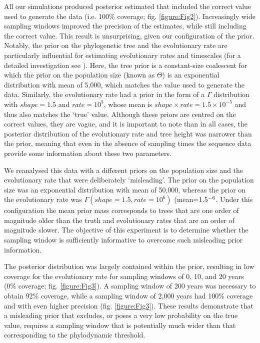 \documentclass[11pt]{article}
\begin{document}
All our simulations produced posterior estimated that included the correct value used to generate the data (i.e. 100\% coverage; fig. \ref{figure:Fig2}). Increasingly wide sampling windows improved the precision of the estimates, while still including the correct value. This result is unsurprising, given our configuration of the prior. Notably, the prior on the phylogenetic tree and the evolutionary rate are particularly influential for estimating evolutionary rates and timescales (for a detailed investigation see \cite{tay2024assessing}). Here, the tree prior is a constant-size coalescent for which the prior on the population size (known as $\Theta$) is an exponential distribution with mean of 5,000, which matches the value used to generate the data. Similarly, the evolutionary rate had a prior in the form of a $\Gamma$ distribution with $shape=1.5$ and $rate=10^{5}$, whose mean is $shape\times rate=1.5\times10^{-5}$ and thus also matches the `true' value. Although these priors are centred on the correct values, they are vague, and it is important to note than in all cases, the posterior distribution of the evolutionary rate and tree height was narrower than the prior, meaning that even in the absence of sampling times the sequence data provide some information about these two parameters.

We reanalysed this data with a different priors on the population size and the evolutionary rate that were deliberately `misleading'. The prior on the population size was an exponential distribution with mean of 50,000, whereas the prior on the evolutionary rate was $\Gamma(shape=1.5, rate=10^{6})$ (mean=$1.5\time10^{-6}$. Under this configuration the mean prior mass corresponds to trees that are one order of magnitude older than the truth and evolutionary rates that are an order of magnitude slower. The objective of this experiment is to determine whether the sampling window is sufficiently informative to overcome such misleading prior information.

The posterior distribution was largely contained within the prior, resulting in low coverage for the evolutionary rate for sampling windows of 0, 10, and 20 years (0\% coverage; fig. \ref{figure:Fig3}). A sampling window of 200 years was necessary to obtain 92\% coverage, while a sampling window of 2,000 years had 100\% coverage and with even higher precision (fig. \ref{figure:Fig3}). These results demonstrate that a misleading prior that excludes, or poses a very low probability on the true value, requires a sampling window that is potentially much wider than that corresponding to the phylodynamic threshold. 
\end{document}
